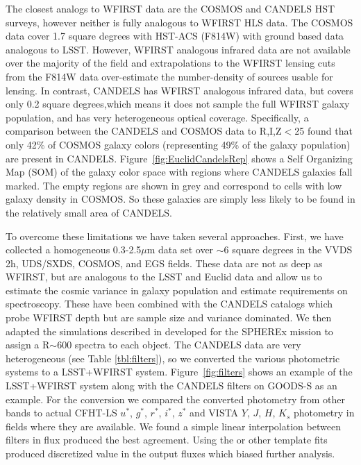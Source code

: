 The closest analogs to WFIRST data are the COSMOS and CANDELS HST surveys, however neither is fully analogous to
 WFIRST HLS data.  The COSMOS data cover 1.7 square degrees with HST-ACS (F814W)
 with ground based data analogous to LSST.  However, WFIRST analogous infrared
 data are not available over the majority of the field and extrapolations to the
 WFIRST lensing cuts from the F814W data over-estimate the number-density of
 sources usable for lensing.  In contrast, CANDELS has WFIRST analogous infrared
 data, but covers only 0.2 square degrees,which means it does not sample the
 full WFIRST galaxy population, and has very heterogeneous optical coverage.
 Specifically, a comparison between the CANDELS and COSMOS data to R,I,Z$<$25
 found that only 42\% of COSMOS galaxy colors (representing 49\% of the galaxy
 population) are present in CANDELS.  Figure~\ref{fig:EuclidCandelsRep} shows a
 Self Organizing Map (SOM) \citep{Masters2015} of the galaxy color space with
 regions where CANDELS galaxies fall marked.  The empty regions are shown in
 grey and correspond to cells with low galaxy density in COSMOS.  So these
 galaxies are simply less likely to be found in the relatively small area of
 CANDELS.

To overcome these limitations we have taken several approaches.  First, we have
collected a homogeneous 0.3-2.5$\mu$m data set over $\sim6$ square degrees in
the VVDS 2h, UDS/SXDS, COSMOS, and EGS fields.  These data are not as deep as
WFIRST, but are analogous to the LSST and Euclid data and allow us to estimate
the cosmic variance in galaxy population and estimate requirements on
spectroscopy.  These have been combined with the CANDELS catalogs which probe
WFIRST depth but are sample size and variance dominated.  We then adapted the
simulations described in \citet{stickley2016} developed for the SPHEREx mission
to assign a R$\sim$600 spectra to each object.  The CANDELS data are very
heterogeneous (see Table \ref{tbl:filters}), so we converted the various
photometric systems to a LSST+WFIRST system.  Figure~\ref{fig:filters} shows an
example of the LSST+WFIRST system along with the CANDELS filters on GOODS-S as
an example.  For the conversion we compared the converted photometry from other
bands to actual CFHT-LS $u^*$, $g^*$, $r^*$, $i^*$, $z^*$ and VISTA $Y$, $J$,
$H$, $K_s$ photometry in fields where they are available.   We found a simple
linear interpolation between filters in flux produced the best agreement.  Using
the \citet{stickley2016} or other template fits produced discretized value  in
the output fluxes which biased further analysis.

